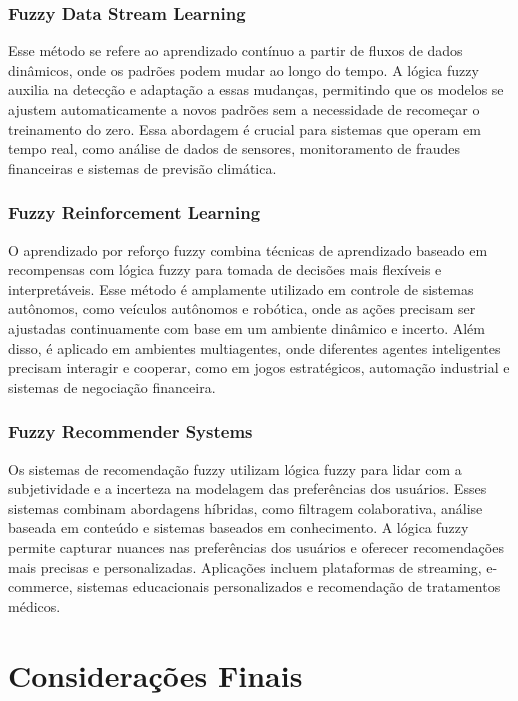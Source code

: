 \documentclass[12pt]{article}
\begin{document}
\subsubsection{Fuzzy Data Stream Learning}

Esse método se refere ao aprendizado contínuo a partir de fluxos de dados dinâmicos, onde os padrões podem mudar ao longo do tempo. A lógica fuzzy auxilia na detecção e adaptação a essas mudanças, permitindo que os modelos se ajustem automaticamente a novos padrões sem a necessidade de recomeçar o treinamento do zero. Essa abordagem é crucial para sistemas que operam em tempo real, como análise de dados de sensores, monitoramento de fraudes financeiras e sistemas de previsão climática.

\subsubsection{Fuzzy Reinforcement Learning}

O aprendizado por reforço fuzzy combina técnicas de aprendizado baseado em recompensas com lógica fuzzy para tomada de decisões mais flexíveis e interpretáveis. Esse método é amplamente utilizado em controle de sistemas autônomos, como veículos autônomos e robótica, onde as ações precisam ser ajustadas continuamente com base em um ambiente dinâmico e incerto. Além disso, é aplicado em ambientes multiagentes, onde diferentes agentes inteligentes precisam interagir e cooperar, como em jogos estratégicos, automação industrial e sistemas de negociação financeira.

\subsubsection{Fuzzy Recommender Systems}

Os sistemas de recomendação fuzzy utilizam lógica fuzzy para lidar com a subjetividade e a incerteza na modelagem das preferências dos usuários. Esses sistemas combinam abordagens híbridas, como filtragem colaborativa, análise baseada em conteúdo e sistemas baseados em conhecimento. A lógica fuzzy permite capturar nuances nas preferências dos usuários e oferecer recomendações mais precisas e personalizadas. Aplicações incluem plataformas de streaming, e-commerce, sistemas educacionais personalizados e recomendação de tratamentos médicos.

\section{Considerações Finais}
\end{document}
